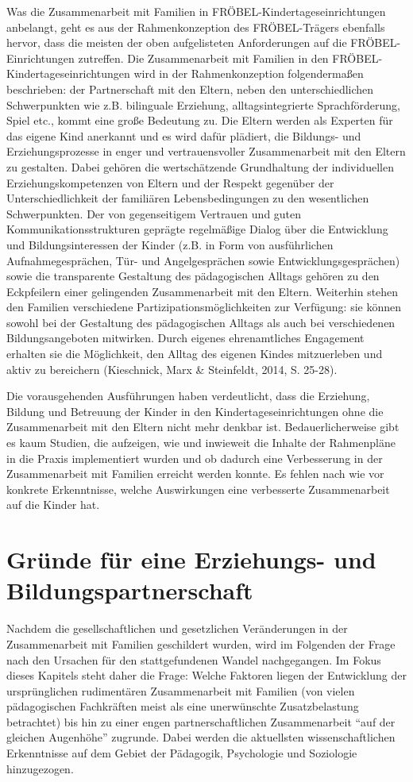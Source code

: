 \documentclass[12pt,a4paper]{article}
\begin{document}
Was die Zusammenarbeit mit Familien in FRÖBEL-Kindertageseinrichtungen anbelangt, geht es aus der Rahmenkonzeption des FRÖBEL-Trägers ebenfalls hervor, dass die meisten der oben aufgelisteten Anforderungen auf die FRÖBEL-Einrichtungen zutreffen. Die Zusammenarbeit mit Familien in den FRÖBEL-Kin\-der\-ta\-ges\-ein\-rich\-tun\-gen wird in der   Rahmenkonzeption folgendermaßen beschrieben: der Partnerschaft mit den Eltern, neben den unterschiedlichen Schwerpunkten wie z.B. bilinguale Erziehung, alltagsintegrierte Sprachförderung, Spiel etc., kommt eine große Bedeutung zu. Die Eltern werden als Experten für das eigene Kind anerkannt und es wird dafür plädiert, die Bildungs- und Erziehungsprozesse in enger und vertrauensvoller Zusammenarbeit mit den Eltern zu gestalten. Dabei gehören die wertschätzende Grundhaltung der individuellen Erziehungskompetenzen von Eltern und der Respekt gegenüber der Unterschiedlichkeit der familiären Lebensbedingungen zu den wesentlichen Schwerpunkten. Der von gegenseitigem Vertrauen und guten Kommunikationsstrukturen geprägte regelmäßige Dialog über die Entwicklung und Bildungsinteressen der Kinder (z.B. in Form von ausführlichen Aufnahmegesprächen, Tür- und Angelgesprächen sowie Entwicklungsgesprächen) sowie die transparente Gestaltung des pädagogischen Alltags gehören zu den Eckpfeilern einer gelingenden Zusammenarbeit mit den Eltern. Weiterhin stehen den Familien verschiedene Partizipationsmöglichkeiten zur Verfügung: sie können sowohl bei der Gestaltung des pädagogischen Alltags als auch bei verschiedenen Bildungsangeboten mitwirken. Durch eigenes ehrenamtliches Engagement erhalten sie die Möglichkeit, den Alltag des eigenen Kindes mitzuerleben und aktiv zu bereichern (Kieschnick, Marx \& Steinfeldt, 2014, S. 25-28).

	Die vorausgehenden Ausführungen haben verdeutlicht, dass die Erziehung, Bildung und Betreuung der Kinder in den Kindertageseinrichtungen ohne die Zusammenarbeit mit den Eltern nicht mehr denkbar ist. Bedauerlicherweise gibt es kaum Studien, die aufzeigen, wie und inwieweit die Inhalte der Rahmenpläne in die Praxis implementiert wurden und ob dadurch eine Verbesserung in der Zusammenarbeit mit Familien erreicht werden konnte. Es fehlen nach wie vor konkrete Erkenntnisse, welche Auswirkungen eine verbesserte Zusammenarbeit auf die Kinder hat.

\section{Gründe für eine Erziehungs- und Bildungspartnerschaft}
Nachdem die gesellschaftlichen und gesetzlichen Veränderungen in der Zusammenarbeit mit Familien geschildert wurden, wird im Folgenden der Frage nach den Ursachen für den stattgefundenen Wandel nachgegangen. Im Fokus dieses Kapitels steht daher die Frage: Welche Faktoren liegen der Entwicklung der ursprünglichen rudimentären Zusammenarbeit mit Familien (von vielen pä\-da\-go\-gi\-schen Fachkräften meist als eine unerwünschte Zusatzbelastung betrachtet) bis hin zu einer engen partnerschaftlichen Zusammenarbeit "`auf der gleichen Augenhöhe"' zugrunde. Dabei werden die aktuellsten wissenschaftlichen Erkenntnisse auf dem Gebiet der Pädagogik, Psychologie und Soziologie hinzugezogen.
\end{document}
